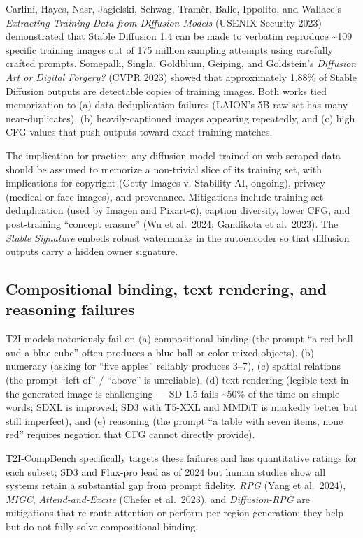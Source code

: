 \documentclass{article}
\begin{document}
Carlini, Hayes, Nasr, Jagielski, Sehwag, Tramèr, Balle, Ippolito, and Wallace's \emph{Extracting Training Data from Diffusion Models} (USENIX Security 2023) demonstrated that Stable Diffusion 1.4 can be made to verbatim reproduce \textasciitilde109 specific training images out of 175 million sampling attempts using carefully crafted prompts. Somepalli, Singla, Goldblum, Geiping, and Goldstein's \emph{Diffusion Art or Digital Forgery?} (CVPR 2023) showed that approximately 1.88\% of Stable Diffusion outputs are detectable copies of training images. Both works tied memorization to (a) data deduplication failures (LAION's 5B raw set has many near-duplicates), (b) heavily-captioned images appearing repeatedly, and (c) high CFG values that push outputs toward exact training matches.

The implication for practice: any diffusion model trained on web-scraped data should be assumed to memorize a non-trivial slice of its training set, with implications for copyright (Getty Images v. Stability AI, ongoing), privacy (medical or face images), and provenance. Mitigations include training-set deduplication (used by Imagen and Pixart-α), caption diversity, lower CFG, and post-training ``concept erasure'' (Wu et al.~2024; Gandikota et al.~2023). The \emph{Stable Signature} \citep{fernandez2023thestablesignature} embeds robust watermarks in the autoencoder so that diffusion outputs carry a hidden owner signature.

\subsection{Compositional binding, text rendering, and reasoning failures}\label{compositional-binding-text-rendering-and-reasoning-failures}

T2I models notoriously fail on (a) compositional binding (the prompt ``a red ball and a blue cube'' often produces a blue ball or color-mixed objects), (b) numeracy (asking for ``five apples'' reliably produces 3--7), (c) spatial relations (the prompt ``left of'' / ``above'' is unreliable), (d) text rendering (legible text in the generated image is challenging --- SD 1.5 fails \textasciitilde50\% of the time on simple words; SDXL is improved; SD3 with T5-XXL and MMDiT is markedly better but still imperfect), and (e) reasoning (the prompt ``a table with seven items, none red'' requires negation that CFG cannot directly provide).

T2I-CompBench specifically targets these failures and has quantitative ratings for each subset; SD3 and Flux-pro lead as of 2024 but human studies show all systems retain a substantial gap from prompt fidelity. \emph{RPG} (Yang et al.~2024), \emph{MIGC}, \emph{Attend-and-Excite} (Chefer et al.~2023), and \emph{Diffusion-RPG} are mitigations that re-route attention or perform per-region generation; they help but do not fully solve compositional binding.
\end{document}
